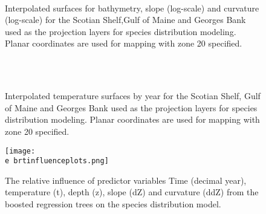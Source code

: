 \documentclass[11pt]{article}
\newcommand{\e}{/backup/bio_data/bio.lobster/figures/} %
\begin{document}
\begin{landscape}
\begin{figure}
\centering

    \\
    \caption{Interpolated surfaces for bathymetry, slope (log-scale) and curvature (log-scale) for the Scotian Shelf,Gulf of Maine and Georges Bank used as the projection layers for species distribution modeling. Planar coordinates are used for mapping with zone 20 specified.}
\end{figure}


\begin{figure}
\centering
    \\
    \\

\caption{Interpolated temperature surfaces by year for the Scotian Shelf, Gulf of Maine and Georges Bank used as the projection layers for species distribution modeling. Planar coordinates are used for mapping with zone 20 specified.}
\end{figure}
\end{landscape}

\begin{figure}

    \texttt{[image: \\e brtinfluenceplots.png]}
    \caption{The relative influence of predictor variables Time (decimal year), temperature (t), depth (z), slope (dZ) and curvature (ddZ) from the boosted regression trees on the species distribution model.}

\end{figure}
\end{document}
